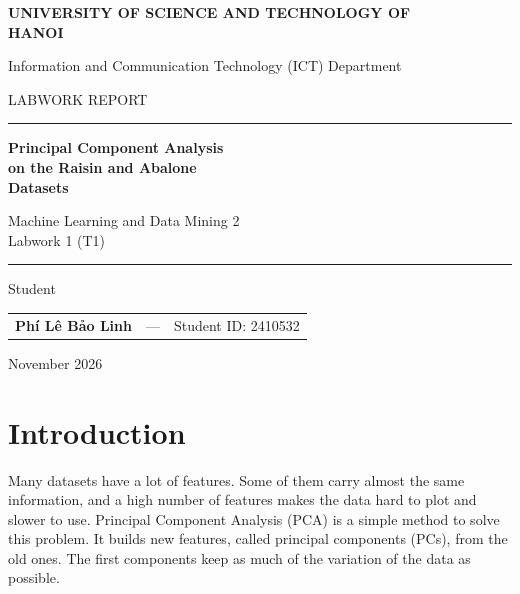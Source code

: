 \documentclass[11pt,a4paper]{article}
\renewcommand{\normalsize}{\fontsize{10}{12.2}\selectfont}
\newcommand{\authorname}{Phí Lê Bảo Linh}%
\newcommand{\authorname}{Ph\'{i} L\^{e} Bao Linh}%
\newcommand{\authorid}{2410532}
\newcommand{\reportdate}{November 2026}
\begin{document}
\normalsize

\thispagestyle{empty}
\begin{center}
\vspace*{1.5cm}
{\large\bfseries UNIVERSITY OF SCIENCE AND TECHNOLOGY OF\\ HANOI\par}
\vspace{4pt}
{\small Information and Communication Technology (ICT) Department\par}
\vspace{1.8cm}
{\small LABWORK REPORT\par}
\vspace{0.6cm}
\rule{0.85\textwidth}{0.6pt}\par
\vspace{0.7cm}
{\Huge\bfseries Principal Component Analysis\\ on the Raisin and Abalone\\ Datasets\par}
\vspace{0.4cm}
{\large Machine Learning and Data Mining 2\\ Labwork 1 (T1)\par}
\vspace{0.7cm}
\rule{0.85\textwidth}{0.6pt}\par
\vspace{1.8cm}
{\large Student\par}
\vspace{0.4cm}
\begin{tabular}{rcl}
\textbf{\authorname} & --- & Student ID: \authorid \\
\end{tabular}
\vfill
{\small \reportdate\par}
\end{center}
\newpage

\section{Introduction}
Many datasets have a lot of features. Some of them carry almost the same information, and a high number of features makes the data hard to plot and slower to use. Principal Component Analysis (PCA) is a simple method to solve this problem. It builds new features, called principal components (PCs), from the old ones. The first components keep as much of the variation of the data as possible.
\end{document}
